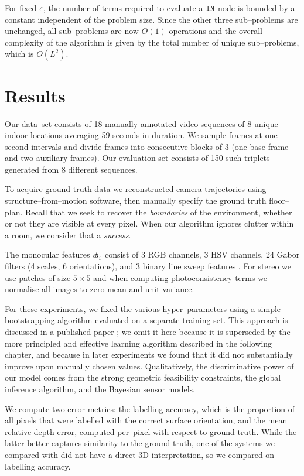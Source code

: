 For fixed $\RoundoffEps$, the number of terms required to evaluate a
$\INlabel$ node is bounded by a constant independent of the problem
size. Since the other three sub--problems are unchanged, all
sub--problems are now $O(1)$ operations and the overall complexity of
the algorithm is given by the total number of unique sub--problems,
which is $O(L^2)$.

\section{Results}
\label{sec:results}
Our data--set consists of 18 manually annotated video sequences of 8
unique indoor locations averaging 59 seconds in duration. We sample
frames at one second intervals and divide frames into consecutive
blocks of 3 (one base frame and two auxiliary frames). Our evaluation
set consists of 150 such triplets generated from 8 different
sequences.

To acquire ground truth data we reconstructed camera trajectories
using structure--from--motion software, then manually specify the
ground truth floor--plan. Recall that we seek to recover the
\textit{boundaries} of the environment, whether or not they are
visible at every pixel. When our algorithm ignores clutter within a
room, we consider that a \textit{success}.

The monocular features $\Feature_i$ consist of 3 RGB channels, 3 HSV
channels, 24 Gabor filters (4 scales, 6 orientations), and 3 binary
line sweep features \cite{Lee09}. For stereo we use patches of size
$5 \times 5$ and when computing photoconsistency terms we normalise
all images to zero mean and unit variance.

For these experiments, we fixed the various hyper--parameters using a
simple bootstrapping algorithm evaluated on a separate training
set. This approach is discussed in a published paper \cite{Flint11};
we omit it here because it is superseded by the more principled and
effective learning algorithm described in the following chapter, and
because in later experiments we found that it did not substantially
improve upon manually chosen values. Qualitatively, the discriminative
power of our model comes from the strong geometric feasibility
constraints, the global inference algorithm, and the Bayesian sensor
models.

We compute two error metrics: the labelling accuracy, which is the
proportion of all pixels that were labelled with the correct surface
orientation, and the mean relative depth error, computed per--pixel
with respect to ground truth. While the latter better captures
similarity to the ground truth, one of the systems we compared with
did not have a direct 3D interpretation, so we compared on labelling
accuracy.

